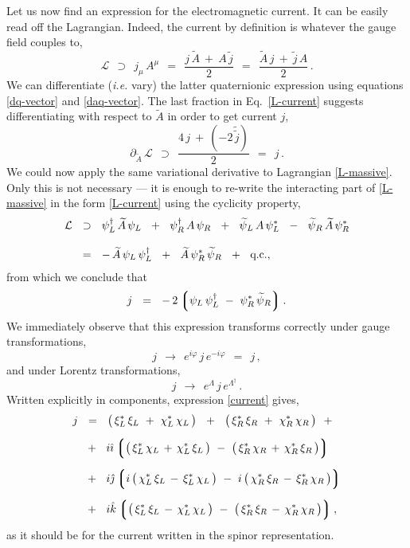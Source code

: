 \documentclass[epsfig,12pt]{article}
\newcommand{\cell}{{\mathcal L}}
\newcommand{\p}{\partial}
\newcommand{\wt}{\widetilde}
\newcommand{\lgr}{\left\lgroup}
\newcommand{\rgr}{\right\rgroup}
\newcommand{\ii}{\hat\imath}
\newcommand{\jj}{\hat\jmath}
\newcommand{\kk}{\hat k}
\begin{document}
	Let us now find an expression for the electromagnetic current.
	It can be easily read off the Lagrangian.
	Indeed, the current by definition is whatever the gauge field couples to,
\begin{equation}
\label{L-current}
	\cell	~~\supset~~	j_\mu\, A^\mu	
		~~=~~	\frac{j\,\wt A ~+~ A\,\wt j } 2
		~~=~~	\frac{\wt A\, j  ~+~  \wt j\, A} 2\,.
\end{equation}
	We can differentiate (\emph{i.e.} vary) the latter quaternionic expression using equations
	\eqref{dq-vector} and \eqref{daq-vector}.
	The last fraction in Eq.~\eqref{L-current} suggests differentiating with respect to $ \wt A $ in order
	to get current $ j $,
\begin{equation}
	\p_{\wt A}\, \cell	~~\supset~~	\frac { 4\,j ~+~ (-2\,\wt{\wt j}) } 2
	~~=~~
	j\,.
\end{equation}
	We could now apply the same variational derivative to Lagrangian \eqref{L-massive}.
	Only this is not necessary --- it is enough to re-write the interacting part of
	\eqref{L-massive} in the form \eqref{L-current} using the cyclicity property,
\begin{align}
%
\notag
	\cell	& ~~\supset~~	\psi_L^\dag\, \wt A\, \psi_L  ~~+~~  \psi_R^\dag\, A\, \psi_R  ~~+~~
				\wt{\psi}{}_L\, A\, \psi_L^*  ~~-~~  \wt{\psi}{}_R\, \wt A\, \psi_R^*
	\\[3mm]
%
	& ~~=~~
	-\, \wt A\, \psi_L\,\psi_L^\dag  ~~+~~ \wt A\, \psi_R^*\,\wt{\psi}{}_R  ~~+~~  \text{q.c.},
\end{align}
	from which we conclude that
\begin{equation}
\label{current}
	j	~~=~~	-\,2 \lgr \psi_L\,\psi_L^\dag  ~-~  \psi_R^*\,\wt\psi{}_R \rgr.
\end{equation}
	We immediately observe that this expression transforms correctly under gauge transformations,
\begin{equation}
	j	~~\rightarrow~~	e^{i\varphi}\,j\,e^{-i\varphi}	~~=~~	j\,,
\end{equation}
	and under Lorentz transformations,
\begin{equation}
	j	~~\rightarrow~~	e^\Lambda\,j\,e^{\Lambda^\dag}\,.
\end{equation}
	Written explicitly in components, expression \eqref{current} gives,
\begin{align}
%
\notag
	j	&  ~~=~~			\big(\, \xi_L^*\,\xi_L ~+~ \chi_L^*\,\chi_L \,\big)  ~~+~~  
						\big(\, \xi_R^*\,\xi_R ~+~ \chi_R^*\,\chi_R \,\big)  ~~+~~
	\\[2mm]
%
\notag
		& ~~+~~		i\ii \lgr	\big(\, \xi_L^*\,\chi_L \,+\, \chi_L^*\,\xi_L \,\big) ~-~
						\big(\, \xi_R^*\,\chi_R \,+\, \chi_R^*\,\xi_R \,\big) \rgr
	\\[2mm]
%
		& ~~+~~		i\jj \lgr	i\,\big(\, \chi_L^*\,\xi_L \,-\, \xi_L^*\,\chi_L \,\big) ~-~
						i\,\big(\, \chi_R^*\,\xi_R \,-\, \xi_R^*\,\chi_R \,\big) \rgr
	\\[2mm]
%
		& ~~+~~		i\kk \lgr	\big(\, \xi_L^*\,\xi_L \,-\, \chi_L^*\,\chi_L \,\big) ~-~
						\big(\, \xi_R^*\,\xi_R \,-\, \chi_R^*\,\chi_R \,\big) \rgr,
\notag
\end{align}
	as it should be for the current written in the spinor representation.
\end{document}

